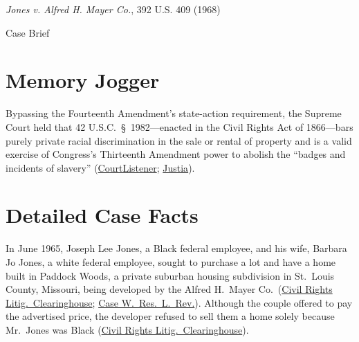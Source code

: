 \documentclass[12pt]{article}
\begin{document}
\begin{center}
{\LARGE \textit{Jones v. Alfred H. Mayer Co.}, 392 U.S. 409 (1968)\par}
\vspace{0.8em}
{\large Case Brief\par}
\end{center}
\vspace{1em}

\section{Memory Jogger}

Bypassing the Fourteenth Amendment's state-action requirement, the Supreme Court held that 42 U.S.C.\ \S~1982---enacted in the Civil Rights Act of 1866---bars purely private racial discrimination in the sale or rental of property and is a valid exercise of Congress's Thirteenth Amendment power to abolish the ``badges and incidents of slavery'' (\href{https://www.courtlistener.com/opinion/107748/jones-v-alfred-h-mayer-co/}{CourtListener}; \href{https://supreme.justia.com/cases/federal/us/392/409/}{Justia}).

\section{Detailed Case Facts}

In June 1965, Joseph Lee Jones, a Black federal employee, and his wife, Barbara Jo Jones, a white federal employee, sought to purchase a lot and have a home built in Paddock Woods, a private suburban housing subdivision in St.\ Louis County, Missouri, being developed by the Alfred H.\ Mayer Co.\ (\href{https://clearinghouse.net/case/10160/}{Civil Rights Litig.\ Clearinghouse}; \href{https://scholarlycommons.law.case.edu/cgi/viewcontent.cgi?params=/context/caselrev/article/2719/&path_info=29_20CaseWResLRev448_1968_1969_.pdf}{Case W.\ Res.\ L.\ Rev.}). Although the couple offered to pay the advertised price, the developer refused to sell them a home solely because Mr.\ Jones was Black (\href{https://clearinghouse.net/case/10160/}{Civil Rights Litig.\ Clearinghouse}).
\end{document}
